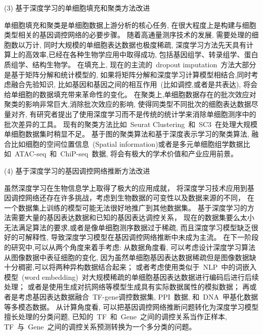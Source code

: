 (3) 基于深度学习的单细胞填充和聚类方法改进

单细胞填充和聚类是单细胞数据上游分析的核心任务, 
在很大程度上是构建与细胞类型相关的基因调控网络的必要步骤。
随着高通量测序技术的发展, 需要处理的细胞数以万计, 同时大规模的单细胞表达数据也极度稀疏,
深度学习方法先天具有计算上的高效率,已经在各种生物学应用中取得成功,
包括基因组学、转录组学、蛋白质组学、结构生物学。
在填充上, 现在的主流的~dropout imputation~方法大部分是基于矩阵分解和统计模型的,
如果将矩阵分解和深度学习计算模型相结合,同时考虑融合先验知识,
比如基因和基因之间的相互作用~(比如调控,或者是共表达),
将会给单细胞的数据填充带来革命性的变化。
在聚类上,单细胞数据存在的批次效应对聚类的影响非常巨大,消除批次效应的影响,
使得同类型不同批次的细胞表达数据尽量对齐,
有研究者提出了使用深度学习而不是传统的统计学来消除单细胞测序中的批次差异的工具。
现有的聚类方法比如~Seurat Clustering~和~SC3~在处理大规模单细胞数据集时稍显不足。
基于图的聚类算法和基于深度表示学习的聚类算法,
融合比如细胞的空间位置信息~(Spatial information)或者是多元单细胞组学数据比如~ATAC-seq~和~ChiP-seq~数据, 
将会有极大的学术价值和产业应用前景。

(4) 基于深度学习的基因调控网络推断方法改进

虽然深度学习在生物信息学上取得了极大的应用成就，
将深度学习技术应用到基因调控网络还存在许多挑战，考虑到生物数据的可变性以及数据来源的不同，
在一个数据集上训练的模型可能无法很好地推广到其他数据集。
基于深度学习的方法需要大量的基因表达数据和已知的基因表达调控关系，
现在的数据集要么太小无法满足算法的要求,或者是像单细胞测序数据过于稀疏,
而且深度学习模型缺乏很好的可解释性,
导致深度学习模型在基因调控网络推断中未成为主流。
在下一阶段的研究中,可以从两个角度来着手考虑:
从数据角度看,
可以考虑设计深度学习算法从图像数据中表征细胞的变化,
因为虽然单细胞基因表达数据稀疏但是图像数据缺十分稠密,可以将两种异构数据结合起来；
或者考虑使用类似于~NLP~中的词嵌入模型~(word embedding)~对大规模稀疏的单细胞基因表达数据进行编码后进行后续处理；
或者是使用生成对抗网络等模型生成具有实际数据属性的模拟数据；
再或者是考虑基因表达数据融合~TF-gene调控数据集, PPI~数据, 和~DNA~甲基化数据等多模态数据。
从计算角度看, 
可以把基因调控网络推断问题转化为深度学习模型擅长处理的分类问题, 已知的~TF~和~Gene~之间的调控关系当作正样本,
TF~与~Gene~之间的调控关系预测转换为一个多分类的问题。